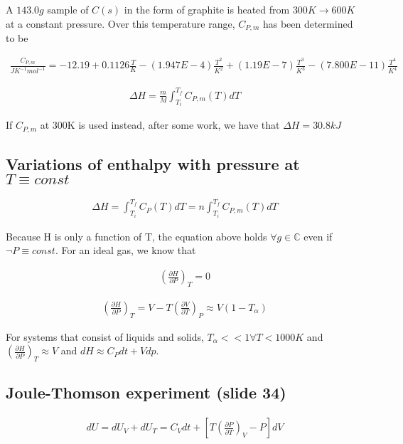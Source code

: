 \documentclass[12pt]{book}
\begin{document}
A $143.0g$ sample of $C(s)$ in the form of graphite is heated from $300K \rightarrow 600K$ at a
constant pressure. Over this temperature range, $C_{P,m}$ has been determined to be

\begin{align*}
    \frac{C_{P,m}}{JK^{-1}mol^{-1}}=-12.19+0.1126\frac{T}{K}-(1.947E-4)\frac{T^2}{K^2}+(1.19E-7)\frac{T^3}{K^3}-(7.800E-11)\frac{T^4}{K^4}
\end{align*}

\begin{align*}
    \Delta H=\frac{m}{M}\int_{T_i}^{T_f}C_{P,m}(T)dT
\end{align*}

If $C_{P,m}$ at 300K is used instead, after some work, we have that $\Delta H=30.8kJ$

\subsection*{Variations of enthalpy with pressure at $T\equiv const$}

\begin{align*}
    \Delta H=\int_{T_i}^{T_f}C_P(T)dT=n\int_{T_i}^{T_f}C_{P,m}(T)dT
\end{align*}

Because H is only a function of T, the equation above holds $\forall g\in \mathbb{C}$ even if $\lnot P\equiv const$. For an ideal gas, we know that

\begin{align*}
    \left(\frac{\partial H}{\partial P}\right)_T=0
\end{align*}

\begin{align*}
    \left(\frac{\partial H}{\partial P}\right)_T=V-T\left(\frac{\partial V}{\partial T}\right)_P\approx V(1-T_\alpha)
\end{align*}

For systems that consist of liquids and solids, $T_\alpha<<1 \forall T<1000K$ and $\left(\frac{\partial H}{\partial P}\right)_T\approx V$ and $dH\approx C_P dt+Vdp$.


\subsection*{Joule-Thomson experiment (slide 34)}

\begin{align*}
    dU=dU_V+dU_T=C_V dt+\left[T\left(\frac{\partial P}{\partial T}\right)_V-P\right]dV
\end{align*}
\end{document}
